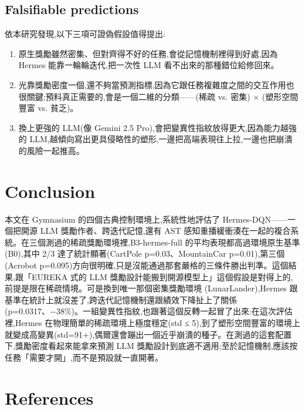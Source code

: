 \documentclass[conference,onecolumn,letterpaper,10pt]{IEEEtran}
\providecommand{\tightlist}{\setlength{\itemsep}{0pt}\setlength{\parskip}{0pt}}
\begin{document}
\subsection{Falsifiable predictions}

依本研究發現,以下三項可證偽假設值得提出:

\begin{enumerate}
\def\labelenumi{\arabic{enumi}.}
\tightlist
\item
  原生獎勵雖然密集、但對齊得不好的任務,會從記憶機制裡得到好處,因為 Hermes 能靠一輪輪迭代,把一次性 LLM 看不出來的那種錯位給修回來。
\item
  光靠獎勵密度一個,還不夠當預測指標,因為它跟任務複雜度之間的交互作用也很關鍵;預料真正需要的,會是一個二維的分類------(稀疏 vs. 密集) × (塑形空間豐富 vs. 貧乏)。
\item
  換上更強的 LLM(像 Gemini 2.5 Pro),會把變異性指紋放得更大,因為能力越強的 LLM,越傾向寫出更具侵略性的塑形,一邊把高端表現往上拉,一邊也把崩潰的風險一起推高。
\end{enumerate}


\section{Conclusion}

本文在 Gymnasium 的四個古典控制環境上,系統性地評估了 Hermes-DQN------一個把開源 LLM 獎勵作者、跨迭代記憶,還有 AST 感知重播緩衝湊在一起的複合系統。在三個測過的稀疏獎勵環境裡,B3-hermes-full 的平均表現都高過環境原生基準 (B0),其中 2/3 達了統計顯著(CartPole p=0.03、MountainCar p=0.01),第三個(Acrobot p=0.095)方向很明確,只是沒能通過那套嚴格的三條件勝出判準。這個結果,跟「EUREKA 式的 LLM 獎勵設計能搬到開源模型上」這個假設是對得上的,前提是限在稀疏情境。可是換到唯一那個密集獎勵環境 (LunarLander),Hermes 跟基準在統計上就沒差了,跨迭代記憶機制還跟績效下降扯上了關係(p=0.0317、−38\%)。一組變異性指紋,也跟著這個反轉一起冒了出來:在這次評估裡,Hermes 在物理簡單的稀疏環境上極度穩定(std ≤ 5),到了塑形空間豐富的環境上就變成高變異(std=91+),偶爾還會蹦出一個近乎崩潰的種子。在測過的這套配置下,獎勵密度看起來能拿來預測 LLM 獎勵設計到底適不適用;至於記憶機制,應該按任務「需要才開」,而不是預設就一直開著。


\section*{References}
\end{document}
